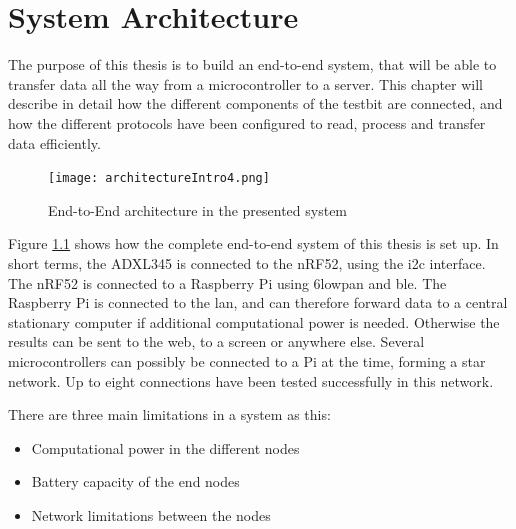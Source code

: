 \chapter{System Architecture}
\label{chp:architecture} 

\noindent The purpose of this thesis is to build an end-to-end system, that will be able to transfer data all the way from a \gls{microcontroller} to a server. This chapter will describe in detail how the different components of the testbit are connected, and how the different protocols have been configured to read, process and transfer data efficiently. 

\begin{figure}[ht]
    \centering
    \texttt{[image: architectureIntro4.png]}    
    \caption{End-to-End architecture in the presented system}
    \label{fig:systemArchitectureThisSystem}
\end{figure}


\noindent Figure \ref{fig:systemArchitectureThisSystem} shows how the complete end-to-end system of this thesis is set up. In short terms, the \gls{ADXL345} is connected to the \gls{nRF52}, using the \gls{i2c} interface. The \gls{nRF52} is connected to a  \gls{Raspberry Pi} using \gls{6lowpan} and \gls{ble}. The \gls{Raspberry Pi} is connected to the \gls{lan}, and can therefore forward data to a central stationary computer if additional computational power is needed. Otherwise the results can be sent to the web, to a screen or anywhere else. Several \glspl{microcontroller} can possibly be connected to a Pi at the time, forming a star network. Up to eight connections have been tested successfully in this network. 
 
\noindent There are three main limitations in a system as this:

\begin{itemize}
  \item Computational power in the different nodes
  \item Battery capacity of the end nodes
  \item Network limitations between the nodes
\end{itemize}




